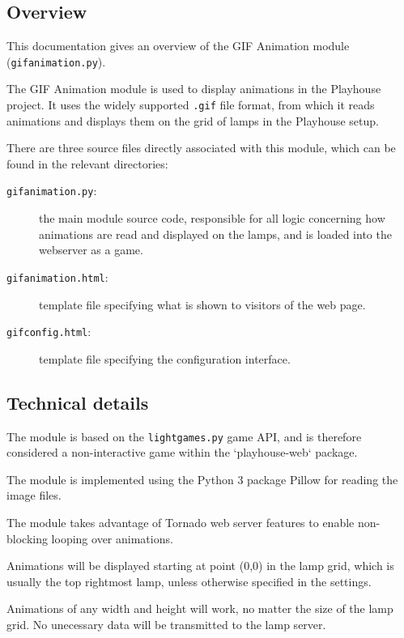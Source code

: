 \subsection{Overview}

This documentation gives an overview of the GIF Animation module (\texttt{gifanimation.py}).

The GIF Animation module is used to display animations in the Playhouse project. It uses the widely supported \texttt{.gif} file format, from which it reads animations
and displays them on the grid of lamps in the Playhouse setup.

There are three source files directly associated with this module, which can be
found in the relevant directories:

\begin{description}
    \item [\texttt{gifanimation.py}:]
    the main module source code, responsible for all logic concerning how animations
    are read and displayed on the lamps, and is loaded into the webserver as a game.

    \item [\texttt{gifanimation.html}:]
    template file specifying what is shown to visitors of the web page.

    \item [\texttt{gifconfig.html}:]
    template file specifying the configuration interface.
\end{description}

\subsection{Technical details}

The module is based on the \texttt{lightgames.py} game API, and is therefore considered a non-interactive game within the `playhouse-web` package.

The module is implemented using the Python 3 package Pillow for reading the image files.

The module takes advantage of Tornado web server features to enable non-blocking looping over animations.

Animations will be displayed starting at point (0,0) in the lamp grid, which is usually the top rightmost lamp, unless otherwise specified in the settings.

Animations of any width and height will work, no matter the size of the lamp grid. No unecessary data will be transmitted to the lamp server.

